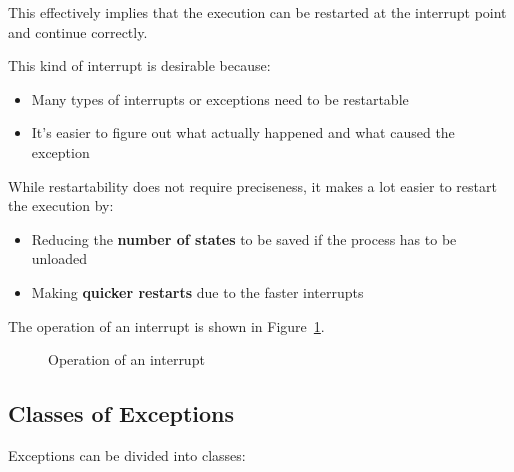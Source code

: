 \documentclass[english]{article}
\begin{document}
This effectively implies that the execution can be restarted at the interrupt point and continue correctly.

\bigskip
This kind of interrupt is desirable because:

\begin{itemize}
  \item Many types of interrupts or exceptions need to be restartable
  \item It's easier to figure out what actually happened and what caused the exception
\end{itemize}

While restartability does not require preciseness, it makes a lot easier to restart the execution by:

\begin{itemize}
  \item Reducing the \textbf{number of states} to be saved if the process has to be unloaded
  \item Making \textbf{quicker restarts} due to the faster interrupts
\end{itemize}

\bigskip
The operation of an interrupt is shown in Figure~\ref{fig:operation-interrupt}.

\begin{figure}
  \bigskip
  \centering
  \caption{Operation of an interrupt}
  \label{fig:operation-interrupt}
  \bigskip
\end{figure}

\subsection{Classes of Exceptions}

Exceptions can be divided into classes:
\end{document}
